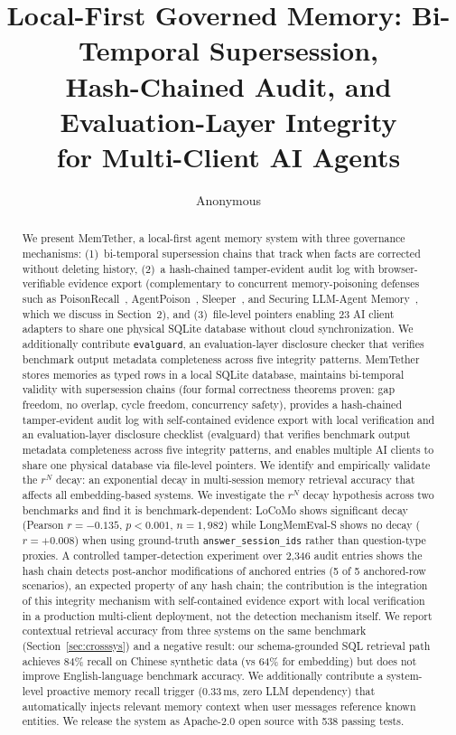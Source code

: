 \documentclass{article}
\title{Local-First Governed Memory: Bi-Temporal Supersession,\\ Hash-Chained Audit, and Evaluation-Layer Integrity\\ for Multi-Client AI Agents}
\author{Anonymous}
\date{}
\begin{document}
\maketitle

\begin{abstract}
We present MemTether, a local-first agent memory system with three governance mechanisms: (1)~bi-temporal supersession chains that track when facts are corrected without deleting history, (2)~a hash-chained tamper-evident audit log with browser-verifiable evidence export (complementary to concurrent memory-poisoning defenses such as PoisonRecall~\citep{poisonrecall}, AgentPoison~\citep{agentpoison}, Sleeper~\citep{sleeper}, and Securing LLM-Agent Memory~\citep{poisoning2}, which we discuss in Section~2), and (3)~file-level pointers enabling 23 AI client adapters to share one physical SQLite database without cloud synchronization. We additionally contribute \texttt{evalguard}, an evaluation-layer disclosure checker that verifies benchmark output metadata completeness across five integrity patterns. MemTether stores memories as typed rows in a local SQLite database, maintains bi-temporal validity with supersession chains (four formal correctness theorems proven: gap freedom, no overlap, cycle freedom, concurrency safety), provides a hash-chained tamper-evident audit log with self-contained evidence export with local verification and an evaluation-layer disclosure checklist (evalguard) that verifies benchmark output metadata completeness across five integrity patterns, and enables multiple AI clients to share one physical database via file-level pointers. We identify and empirically validate the $r^N$ decay: an exponential decay in multi-session memory retrieval accuracy that affects all embedding-based systems. We investigate the $r^N$ decay hypothesis across two benchmarks and find it is benchmark-dependent: LoCoMo shows significant decay (Pearson $r = -0.135$, $p < 0.001$, $n = 1{,}982$) while LongMemEval-S shows no decay ($r = +0.008$) when using ground-truth \texttt{answer\_session\_ids} rather than question-type proxies. A controlled tamper-detection experiment over 2{,}346 audit entries shows the hash chain detects post-anchor modifications of anchored entries (5 of 5 anchored-row scenarios), an expected property of any hash chain; the contribution is the integration of this integrity mechanism with self-contained evidence export with local verification in a production multi-client deployment, not the detection mechanism itself. We report contextual retrieval accuracy from three systems on the same benchmark (Section~\ref{sec:crosssys}) and a negative result: our schema-grounded SQL retrieval path achieves 84\% recall on Chinese synthetic data (vs 64\% for embedding) but does not improve English-language benchmark accuracy. We additionally contribute a system-level proactive memory recall trigger (0.33\,ms, zero LLM dependency) that automatically injects relevant memory context when user messages reference known entities. We release the system as Apache-2.0 open source with 538 passing tests.
\end{abstract}
\end{document}
